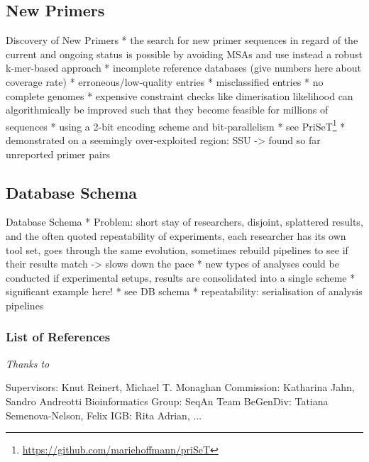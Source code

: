 \documentclass[xcolor=dvipsnames,envcountsect]{beamer}
\begin{document}
\subsection{New Primers}
\begin{frame}{Discovery of New Primers}
    * the search for new primer sequences in regard of the current and ongoing status is possible by avoiding MSAs and use instead a robust k-mer-based approach
    * incomplete reference databases (give numbers here about coverage rate)
    * erroneous/low-quality entries 
    * misclassified entries
    * no complete genomes
* expensive constraint checks like dimerisation likelihood can algorithmically be improved such that they become feasible for millions of sequences
    *  using a 2-bit encoding scheme and bit-parallelism
    * see PriSeT\footnote{\url{https://github.com/mariehoffmann/priSeT}}
* demonstrated on a seemingly over-exploited region: SSU -> found so far unreported primer pairs
\end{frame}

\subsection{Database Schema}
\begin{frame}{Database Schema}
    * Problem: short stay of researchers, disjoint, splattered results, and the often quoted repeatability of experiments, each researcher has its own tool set, goes through the same evolution, sometimes rebuild pipelines to see if their results match -> slows down the pace
* new types of analyses could be conducted if experimental setups, results are consolidated into a single scheme
*  significant example here!
* see DB schema
* repeatability: serialisation of analysis pipelines

\end{frame}


	\begin{frame}[allowframebreaks]
		\justifying
		\frametitle{List of References}
		\printbibliography
	\end{frame}
	\begin{frame}
		\centering
		\begin{block}
			\scshape
				\begin{center}
					\large\emph{Thanks to}
				\end{center}
				Supervisors: Knut Reinert, Michael T. Monaghan\newline
				Commission: Katharina Jahn, Sandro Andreotti\newline
				Bioinformatics Group: SeqAn Team\newline
				BeGenDiv: Tatiana Semenova-Nelson, Felix \newline
				IGB: Rita Adrian, ...
		\end{block}
	\end{frame}
\end{document}
